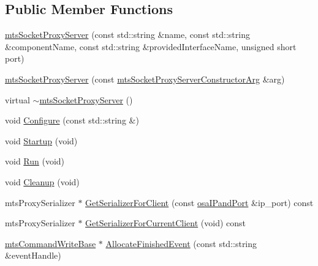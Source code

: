 \subsection*{Public Member Functions}
\begin{DoxyCompactItemize}
\item 
\hyperlink{classmts_socket_proxy_server_a6ebb4c4b1dfaa429094b3fdac1659471}{mts\+Socket\+Proxy\+Server} (const std\+::string \&name, const std\+::string \&component\+Name, const std\+::string \&provided\+Interface\+Name, unsigned short port)
\item 
\hyperlink{classmts_socket_proxy_server_ac55aba203dc89676c5fc133e5b9a6090}{mts\+Socket\+Proxy\+Server} (const \hyperlink{classmts_socket_proxy_server_constructor_arg}{mts\+Socket\+Proxy\+Server\+Constructor\+Arg} \&arg)
\item 
virtual \hyperlink{classmts_socket_proxy_server_ac16f10d6cf3bb67eda9c2f9797e69fec}{$\sim$mts\+Socket\+Proxy\+Server} ()
\item 
void \hyperlink{classmts_socket_proxy_server_afa15c24264a578805db0e08773a59044}{Configure} (const std\+::string \&)
\item 
void \hyperlink{classmts_socket_proxy_server_ac503a2964c4d1187775bf48a91708bbd}{Startup} (void)
\item 
void \hyperlink{classmts_socket_proxy_server_a10ea0b133dccf740841af2058b332ced}{Run} (void)
\item 
void \hyperlink{classmts_socket_proxy_server_a53e1c85a91a01f1e12301860e7de9673}{Cleanup} (void)
\item 
mts\+Proxy\+Serializer $\ast$ \hyperlink{classmts_socket_proxy_server_a53ec6e91f127a1a301cd6225bc92fdb4}{Get\+Serializer\+For\+Client} (const \hyperlink{structosa_i_pand_port}{osa\+I\+Pand\+Port} \&ip\+\_\+port) const 
\item 
mts\+Proxy\+Serializer $\ast$ \hyperlink{classmts_socket_proxy_server_a2af72d89d2922a1c1eb711c035cd90bb}{Get\+Serializer\+For\+Current\+Client} (void) const 
\item 
\hyperlink{classmts_command_write_base}{mts\+Command\+Write\+Base} $\ast$ \hyperlink{classmts_socket_proxy_server_a2c65e1478bf9b6224c567d7991132a1f}{Allocate\+Finished\+Event} (const std\+::string \&event\+Handle)
\end{DoxyCompactItemize}
